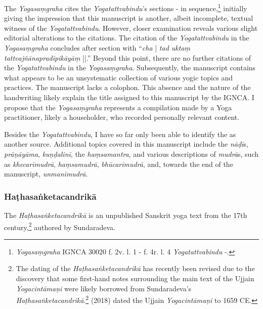 The \emph{Yogasaṃgraha} cites the \emph{Yogatattvabindu}'s sections - in sequence,\footnote{\emph{Yogasaṃgraha} IGNCA 30020 f. 2v. l. 1 - f. 4r. l. 4 \approx  \emph{Yogatattvabindu} -.} initially giving the impression that this manuscript is another, albeit incomplete, textual witness of the \emph{Yogatattvabindu}. However, closer examination reveals various slight editorial alterations to the citations. The citation of the \emph{Yogatattvabindu} in the \emph{Yogasaṃgraha} concludes after section  with ``\textit{cha} | \textit{tad uktaṃ tattvajñānapradīpikāyāṃ} ||.'' Beyond this point, there are no further citations of the \emph{Yogatattvabindu} in the \emph{Yogasaṃgraha}. Subsequently, the manuscript contains what appears to be an unsystematic collection of various yogic topics and practices. The manuscript lacks a colophon. This absence and the nature of the handwriting likely explain the title assigned to this manuscript by the IGNCA. I propose that the \emph{Yogasaṃgraha} represents a compilation made by a Yoga practitioner, likely a householder, who recorded personally relevant content.

Besides the \emph{Yogatattvabindu}, I have so far only been able to identify the  as another source. Additional topics covered in this manuscript include the \textit{nāḍī}s, \textit{prāṇāyāma}, \textit{kuṇḍalinī}, the \emph{haṃsamantra}, and various descriptions of \emph{mudrā}s, such as \textit{khecarīmudrā}, \textit{haṃsamudrā}, \textit{bhūcarīmudrā}, and, towards the end of the manuscript, \textit{unmanīmudrā}.   

\subsubsection{Haṭhasaṅketacandrikā}
\label{hathacandrika}

The \emph{Haṭhasaṅketacandrikā} is an unpublished Sanskrit yoga text from the 17th century,\footnote{The dating of the \textit{Haṭhasaṅketacandrikā} has recently been revised due to the discovery that some first-hand notes surrounding the main text of the Ujjain \textit{Yogacintāmaṇi} were likely borrowed from Sundaradeva's \textit{Haṭhasaṅketacandrikā}.\footnote{Cf. \citeauthor[2024: 52-54]{birch2024}.} \citeauthor{birch2018proliferation} (2018) dated the Ujjain \textit{Yogacintāmaṇi} to 1659 CE.} authored by Sundaradeva.

